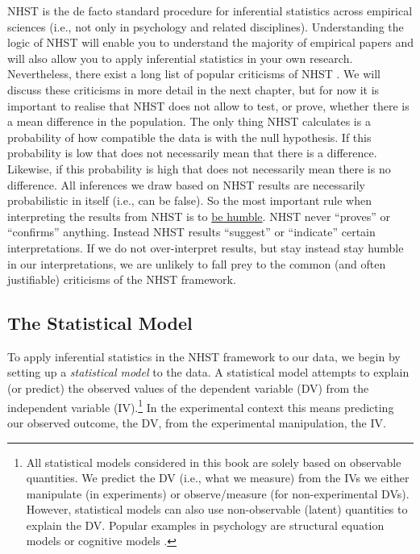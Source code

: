 \documentclass[
]{book}
\begin{document}
NHST is the de facto standard procedure for inferential statistics across empirical sciences (i.e., not only in psychology and related disciplines). Understanding the logic of NHST will enable you to understand the majority of empirical papers and will also allow you to apply inferential statistics in your own research. Nevertheless, there exist a long list of popular criticisms of NHST \citep[e.g.,][]{rozeboom1960, meehl1978, cohen1994, nickerson2000, wagenmakers2007}. We will discuss these criticisms in more detail in the next chapter, but for now it is important to realise that NHST does not allow to test, or prove, whether there is a mean difference in the population. The only thing NHST calculates is a probability of how compatible the data is with the null hypothesis. If this probability is low that does not necessarily mean that there is a difference. Likewise, if this probability is high that does not necessarily mean there is no difference. All inferences we draw based on NHST results are necessarily probabilistic in itself (i.e., can be false). So the most important rule when interpreting the results from NHST is to \href{https://youtu.be/tvTRZJ-4EyI}{be humble}. NHST never ``proves'' or ``confirms'' anything. Instead NHST results ``suggest'' or ``indicate'' certain interpretations. If we do not over-interpret results, but stay instead stay humble in our interpretations, we are unlikely to fall prey to the common (and often justifiable) criticisms of the NHST framework.

\hypertarget{the-statistical-model}{%
\subsection{The Statistical Model}\label{the-statistical-model}}

To apply inferential statistics in the NHST framework to our data, we begin by setting up a \emph{statistical model} to the data. A statistical model attempts to explain (or predict) the observed values of the dependent variable (DV) from the independent variable (IV).\footnote{All statistical models considered in this book are solely based on observable quantities. We predict the DV (i.e., what we measure) from the IVs we either manipulate (in experiments) or observe/measure (for non-experimental DVs). However, statistical models can also use non-observable (latent) quantities to explain the DV. Popular examples in psychology are structural equation models \citep[e.g.,][]{kline2015} or cognitive models \citep[e.g.,][]{lee2013}.} In the experimental context this means predicting our observed outcome, the DV, from the experimental manipulation, the IV.
\end{document}
